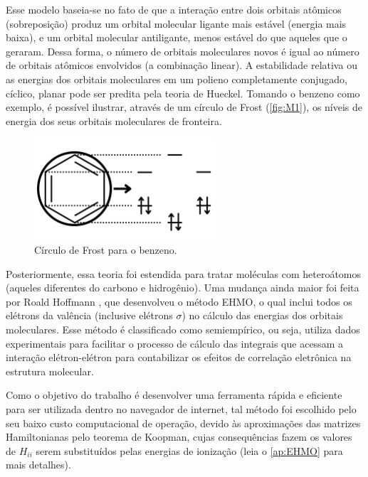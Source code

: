 Esse modelo baseia-se no fato de que a interação entre dois orbitais atômicos (sobreposição) produz um orbital molecular ligante mais estável (energia mais baixa), e um orbital molecular antiligante, menos estável do que aqueles que o geraram. Dessa forma, o número de orbitais moleculares novos é igual ao número de orbitais atômicos envolvidos (a combinação linear). A estabilidade relativa ou as energias dos orbitais moleculares em um polieno completamente conjugado, cíclico, planar pode ser predita pela teoria de Hueckel. Tomando o benzeno como exemplo, é possível ilustrar, através de um círculo de Frost (\autoref{fig:M1}), os níveis de energia dos seus orbitais moleculares de fronteira.

\begin{figure}[htb]
	\caption{\label{fig:M1} Círculo de Frost para o benzeno.}
	\begin{center}
		\includegraphics[width=0.60\textwidth]{images/figM.png}
	\end{center}
\end{figure}


Posteriormente, essa teoria foi estendida para tratar moléculas com heteroátomos (aqueles diferentes do carbono e hidrogênio)\autocite{Liwschitz1963}. Uma mudança ainda maior foi feita por Roald Hoffmann \autocite{Hoffmann1963}, que desenvolveu o método \gls{EHMO}, o qual inclui todos os elétrons da valência (inclusive elétrons $\sigma$) no cálculo das energias dos orbitais moleculares. Esse método é classificado como semiempírico, ou seja, utiliza dados experimentais para facilitar o processo de cálculo das integrais que acessam a interação elétron-elétron para contabilizar os efeitos de correlação eletrônica na estrutura molecular.

Como o objetivo do trabalho é desenvolver uma ferramenta rápida e eficiente para ser utilizada dentro no navegador de internet, tal método foi escolhido pelo seu baixo custo computacional de operação, devido às aproximações das matrizes Hamiltonianas pelo teorema de Koopman, cujas consequências fazem os valores de $H_{ii}$ serem substituídos pelas energias de ionização (leia o \autoref{ap:EHMO} para mais detalhes).

